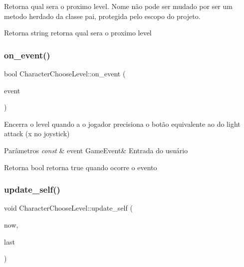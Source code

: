 Retorna qual sera o proximo level. Nome não pode ser mudado por ser um metodo herdado da classe pai, protegida pelo escopo do projeto. 

\begin{DoxyReturn}{Retorna}
string retorna qual sera o proximo level 
\end{DoxyReturn}
\mbox{\label{classCharacterChooseLevel_a2fb500ba943a4f22ed01be915b59452a}} 
\subsubsection{\texorpdfstring{on\+\_\+event()}{on\_event()}}
{\footnotesize\ttfamily bool Character\+Choose\+Level\+::on\+\_\+event (\begin{DoxyParamCaption}\item[{const Game\+Event \&}]{event }\end{DoxyParamCaption})\hspace{0.3cm}{\ttfamily [protected]}}



Encerra o level quando a o jogador precisiona o botão equivalente ao do light attack (x no joystick) 


\begin{DoxyParams}{Parâmetros}
{\em const} & event Game\+Event\& Entrada do usuário \\
\hline
\end{DoxyParams}
\begin{DoxyReturn}{Retorna}
bool retorna true quando ocorre o evento 
\end{DoxyReturn}
\mbox{\label{classCharacterChooseLevel_a28a65c50ef528b2fb2d12ebef93e7426}} 
\subsubsection{\texorpdfstring{update\+\_\+self()}{update\_self()}}
{\footnotesize\ttfamily void Character\+Choose\+Level\+::update\+\_\+self (\begin{DoxyParamCaption}\item[{unsigned}]{now,  }\item[{unsigned}]{last }\end{DoxyParamCaption})\hspace{0.3cm}{\ttfamily [protected]}}



